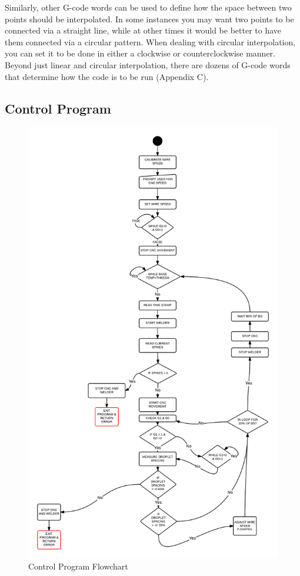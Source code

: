 \documentclass[12pt]{article}
\newlength\tindent
\renewcommand{\indent}{\hspace*{\tindent}}
\begin{document}
\indent Similarly, other G-code words can be used to define how the space between two points should be interpolated. In some instances you may want two points to be connected via a straight line, while at other times it would be better to have them connected via a circular pattern. When dealing with circular interpolation, you can set it to be done in either a clockwise or counterclockwise manner. Beyond just linear and circular interpolation, there are dozens of G-code words that determine how the code is to be run (Appendix C). 

\clearpage

\subsection{Control Program}

\begin{figure}[!h]
\centering
\includegraphics[scale=.7]{control}
\caption{Control Program Flowchart}
\end{figure}
\end{document}
